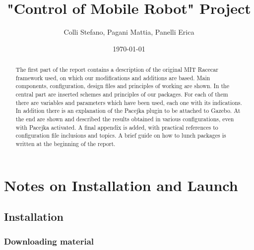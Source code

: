 \documentclass[12pt, letterpaper]{report}
\title{"Control of Mobile Robot" Project}
\author{Colli Stefano, Pagani Mattia, Panelli Erica}
\date{\today}
\begin{document}
	


\begin{abstract}
The first part of the report contains a description of the original MIT Racecar framework used, on which our modifications and additions are based. Main components, configuration, design files and principles of working are shown. In the central part are inserted schemes and principles of our packages. For each of them there are variables and parameters which have been used, each one with its indications. In addition there is an explanation of the Pacejka plugin to be attached to Gazebo. At the end are shown and described the results obtained in various configurations, even with Pacejka activated. A final appendix is added, with practical references to configuration file inclusions and topics. A brief guide on how to lunch packages is written at the beginning of the report.
\end{abstract}

\tableofcontents

\newpage

%

\chapter{Notes on Installation and Launch}

\section{Installation}

\subsection{Downloading material}
\end{document}

